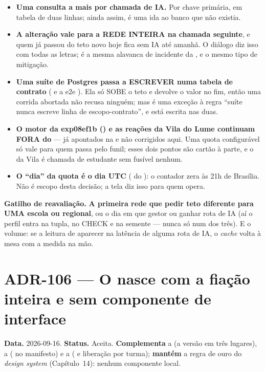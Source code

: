 \begin{itemize}
  \item \textbf{Uma consulta a mais por chamada de IA.} Por chave primária, em
    tabela de duas linhas; ainda assim, é uma ida ao banco que não existia.
  \item \textbf{A alteração vale para a REDE INTEIRA na chamada seguinte}, e
    quem já passou do teto novo hoje fica sem IA até amanhã. O diálogo diz isso
    com todas as letras; é a mesma alavanca de incidente da , e o
    mesmo tipo de mitigação.
  \item \textbf{Uma suíte de Postgres passa a ESCREVER numa tabela de contrato}
    ( e a e2e ). Ela só SOBE o
    teto e devolve o valor no fim, então uma corrida abortada não recusa
    ninguém; mas é uma exceção à regra \enquote{suíte nunca escreve linha de
    escopo-contrato}, e está escrita nas duas.
  \item \textbf{O motor da exp08ef1b () e as reações da Vila do
    Lume continuam FORA do } --- já apontados na
     e não corrigidos aqui. Uma quota configurável só vale para
    quem passa pelo funil; esses dois pontos são cartão à parte, e o da Vila é
    chamada de estudante sem fusível nenhum.
  \item \textbf{O \enquote{dia} da quota é o dia UTC} ( do
    ): o contador zera às 21h de Brasília. Não é escopo desta
    decisão; a tela diz isso para quem opera.
\end{itemize}

\textbf{Gatilho de reavaliação.} \textbf{A primeira rede que pedir teto
diferente para UMA escola ou regional}, ou o dia em que gestor ou 
ganhar rota de IA (aí o perfil entra na tupla, no CHECK e na semente --- nunca
só num dos três). E o volume: se a leitura de  aparecer na
latência de alguma rota de IA, o \emph{cache} volta à mesa com a medida na mão.

\section{ADR-106 --- O  nasce com a fiação inteira e sem componente de interface}
\label{adr:template-com-fiacao}

\textbf{Data.} 2026-09-16. \textbf{Status.} Aceita.
\textbf{Complementa} a  (a versão em três lugares), a 
( no manifesto) e a  ( e liberação por
turma); \textbf{mantém} a regra de ouro do \emph{design system}
(Capítulo~14): nenhum componente local.

